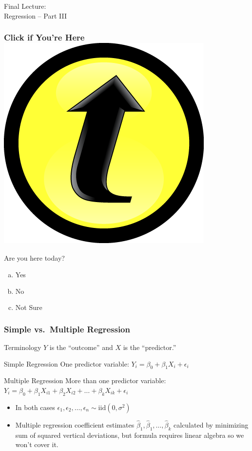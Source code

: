 \documentclass{beamer}
\begin{document}
\begin{frame}
\begin{center}
	\huge Final Lecture: \\ Regression -- Part III
\end{center}
\end{frame}
\begin{frame}
	\frametitle{Click if You're Here \hfill \includegraphics[scale = 0.05]{./images/clicker}}
	Are you here today?
	\begin{enumerate}[(a)]
		\item Yes 
		\item No
		\item Not Sure
	\end{enumerate}
\end{frame}
\begin{frame}
\frametitle{Simple vs.\ Multiple Regression}
\begin{block}{Terminology}
$Y$ is the ``outcome'' and $X$ is the ``predictor.''
\end{block}

\begin{block}{Simple Regression}
One predictor variable: $Y_i = \beta_0 + \beta_1 X_i + \epsilon_i$
\end{block}
\begin{block}{Multiple Regression}
More than one predictor variable: $Y_i = \beta_0 + \beta_1 X_{i1} + \beta_2 X_{i2} +  \hdots + \beta_k X_{ik} + \epsilon_i$
\end{block}


\begin{itemize}
	\item In both cases $\epsilon_1, \epsilon_2, \hdots, \epsilon_n \sim \mbox{iid} (0,\sigma^2)$
	\item Multiple regression coefficient estimates $\widehat{\beta}_1, \widehat{\beta}_1, \hdots, \widehat{\beta}_k$ calculated by minimizing  sum of squared vertical deviations, but formula requires linear algebra so we won't cover it.
\end{itemize}
\end{frame}
\end{document}
